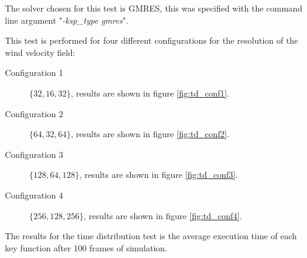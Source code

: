 The solver chosen for this test is GMRES, this was specified with the command
line argument "\emph{-ksp\_type gmres}".

This test is performed for four different configurations for the resolution of
the wind velocity field:
\begin{description}
	\item[Configuration 1] $ \{ 32, 16, 32 \} $, results are shown in figure
		\ref{fig:td_conf1}.
	\item[Configuration 2] $ \{ 64, 32, 64 \} $, results are shown in figure
		\ref{fig:td_conf2}.
	\item[Configuration 3] $ \{ 128, 64, 128 \} $, results are shown in figure
		\ref{fig:td_conf3}.
	\item[Configuration 4] $ \{ 256, 128, 256 \} $, results are shown in figure
		\ref{fig:td_conf4}.
\end{description}

The results for the time distribution test is the average execution time of each
key function after 100 frames of simulation.

